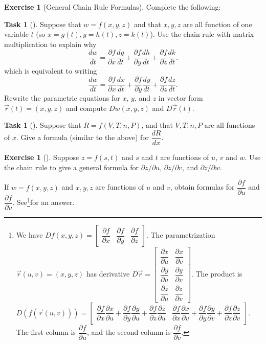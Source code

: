 \documentclass[10pt,]{book}
\theoremstyle{plain}
\theoremstyle{definition}
\theoremstyle{definition}
\theoremstyle{definition}
\theoremstyle{definition}
\newtheorem{exploration}[project]{Exercise}
\newtheorem{task}[project]{Task}
\theoremstyle{definition}
\numberwithin{equation}{section}
\newcommand{\amp}{&}
\begin{document}
\begin{exploration}[General Chain Rule Formulas]\label{exploration-157}
Complete the following:%
\begin{task}[]\label{task-367}
Suppose that \(w=f(x,y,z)\) and that \(x,y,z\) are all function of one variable \(t\) (so \(x=g(t), y=h(t), z=k(t)\)). Use the chain rule with matrix multiplication to explain why%
\begin{equation*}
\frac{dw}{dt} 
= \frac{\partial f}{\partial x}\frac{dg}{dt}+\frac{\partial f}{\partial y}\frac{dh}{dt}+\frac{\partial f}{\partial z}\frac{dk}{dt} 
.
\end{equation*}
which is equivalent to writing%
\begin{equation*}
\frac{dw}{dt} 
= \frac{\partial f}{\partial x}\frac{dx}{dt}+\frac{\partial f}{\partial y}\frac{dy}{dt}+\frac{\partial f}{\partial z}\frac{dz}{dt} 
.
\end{equation*}
Rewrite the parametric equations for \(x\), \(y\), and \(z\) in vector form \(\vec r(t) = (x,y,z)\) and compute \(Dw(x,y,z)\) and \(D\vec r(t)\).%
%
\end{task}
\begin{task}[]\label{task-368}
Suppose that \(R=f(V,T,n,P)\), and that \(V,T,n,P\) are all functions of \(x\).  Give a formula (similar to the above) for \(\dfrac{dR}{dx}.\)%
\end{task}
\end{exploration}
\begin{exploration}[]\label{exploration-158}
\larsonfive{ } Suppose \(z=f(s,t)\) and \(s\) and \(t\) are functions of \(u\), \(v\) and \(w\). Use the chain rule to give a general formula for \(\partial z/\partial u\), \(\partial z/\partial v\), and \(\partial z/\partial w\).%
\end{exploration}
If \(w=f(x,y,z)\) and \(x,y,z\) are functions of \(u\) and \(v\), obtain formulas for \(\dfrac{\partial f}{\partial u}\) and \(\dfrac{\partial f}{\partial v}\). See\footnote{We have \(Df(x,y,z)
=\begin{bmatrix}\dfrac{\partial f}{\partial x}\amp \dfrac{\partial f}{\partial y}\amp \dfrac{\partial f}{\partial z}
\end{bmatrix}\). The parametrization \(\vec r(u,v)=(x,y,z)\) has derivative \(D\vec r 
=\begin{bmatrix}\dfrac{\partial x}{\partial u}\amp \dfrac{\partial x}{\partial v}\\
\dfrac{\partial y}{\partial u}\amp \dfrac{\partial y}{\partial v}\\
\dfrac{\partial z}{\partial u}\amp \dfrac{\partial z}{\partial v}
\end{bmatrix}\). The product is \(D(f(\vec r(u,v)))
=\begin{bmatrix}\dfrac{\partial f}{\partial x}\dfrac{\partial x}{\partial u}+
\dfrac{\partial f}{\partial y}\dfrac{\partial y}{\partial u}+
\dfrac{\partial f}{\partial z}\dfrac{\partial z}{\partial u}\amp 
\dfrac{\partial f}{\partial x}\dfrac{\partial x}{\partial v}+
\dfrac{\partial f}{\partial y}\dfrac{\partial y}{\partial v}+
\dfrac{\partial f}{\partial z}\dfrac{\partial z}{\partial v}
\end{bmatrix}\). The first column is \(\dfrac{\partial f}{\partial u}\), and the second column is \(\dfrac{\partial f}{\partial v}\).\label{fn-5}}for an answer.%
\end{document}
